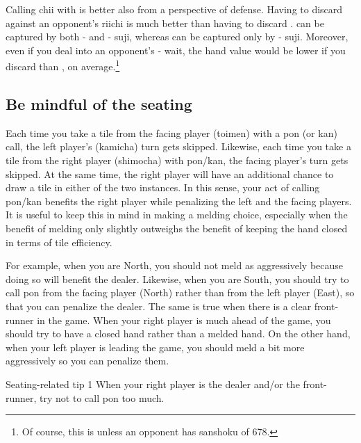 \bigskip
Calling {\jap chii} with {\LARGE{}} is better also from a perspective of defense. Having to discard {\LARGE{}} against an opponent's riichi is much better than having to discard {\LARGE{}}. {\LARGE{}} can be captured by both {\LARGE{}-} and {\LARGE{}-} {\jap suji}, whereas {\LARGE{}} can be captured only by {\LARGE{}-} {\jap suji}. Moreover, even if you deal into an opponent's {\LARGE{}-} wait, the hand value would be lower if you discard {\LARGE{}} than {\LARGE{}}, on average.\footnote{Of course, this is unless an opponent has {\jap sanshoku} of 678.} 


\subsection{Be mindful of the seating}
Each time you take a tile from the facing player ({\jap toimen}) with a {\jap pon} (or {\jap kan}) call, the left player's ({\jap kamicha}) turn gets skipped. Likewise, each time you take a tile from the right player ({\jap shimocha}) with {\jap pon/kan}, the facing player's turn gets skipped. At the same time, the right player will have an additional chance to draw a tile in either of the two instances. In this sense, your act of calling {\jap pon/kan} benefits the right player while penalizing the left and the facing players. 
It is useful to keep this in mind in making a melding choice, especially when the benefit of melding only slightly outweighs the benefit of keeping the hand closed in terms of tile efficiency.

\bigskip
For example, when you are North, you should not meld as aggressively because doing so will benefit the dealer. Likewise, when you are South, you should try to call {\jap pon} from the facing player (North) rather than from the left player (East), so that you can penalize the dealer. 
The same is true when there is a clear front-runner in the game. When your right player is much ahead of the game, you should try to have a closed hand rather than a melded hand. On the other hand, when your left player is leading the game, you should meld a bit more aggressively so you can penalize them. 

\begin{itembox}[c]{Seating-related tip 1}
When your right player is the dealer and/or the front-runner, try not to call {\jap pon} too much. 
\end{itembox}


